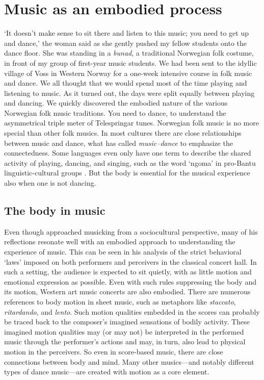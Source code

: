 \chapter{Music as an embodied process}\label{chapter:music-cognition}

`It doesn't make sense to sit there and listen to this music; you need to get up and dance,' the woman said as she gently pushed my fellow students onto the dance floor. She was standing in a \emph{bunad}, a traditional Norwegian folk costume, in front of my group of first-year music students. We had been sent to the idyllic village of Voss in Western Norway for a one-week intensive course in folk music and dance. We all thought that we would spend most of the time playing and listening to music. As it turned out, the days were split equally between playing and dancing. We quickly discovered the embodied nature of the various Norwegian folk music traditions. You need to dance, to understand the asymmetrical triple meter of Telespringar tunes. Norwegian folk music is no more special than other folk musics. In most cultures there are close relationships between music and dance, what \citet{haugen_music-dance._2016} has called \emph{music--dance} to emphasize the connectedness. Some languages even only have one term to describe the shared activity of playing, dancing, and singing, such as the word `ngoma' in pro-Bantu linguistic-cultural groups  \citep{bjorkvold_muse_1992,sarath_redefining_2016}. But the body is essential for the musical experience also when one is not dancing.


\section{The body in music}

Even though \citet{small_musicking:_1998} approached musicking from a sociocultural perspective, many of his reflections resonate well with an embodied approach to understanding the experience of music. This can be seen in his analysis of the strict behavioral `laws' imposed on both performers and perceivers in the classical concert hall. In such a setting, the audience is expected to sit quietly, with as little motion and emotional expression as possible. Even with such rules suppressing the body and its motion, Western art music concerts are also embodied. There are numerous references to body motion in sheet music, such as metaphors like \emph{staccato}, \emph{ritardando}, and \emph{lento}. Such motion qualities embedded in the scores can probably be traced back to the composer's imagined sensations of bodily activity. These imagined motion qualities may (or may not) be interpreted in the performed music through the performer's actions and may, in turn, also lead to physical motion in the perceivers. So even in score-based music, there are close connections between body and mind. Many other musics---and notably different types of dance music---are created with motion as a core element.

